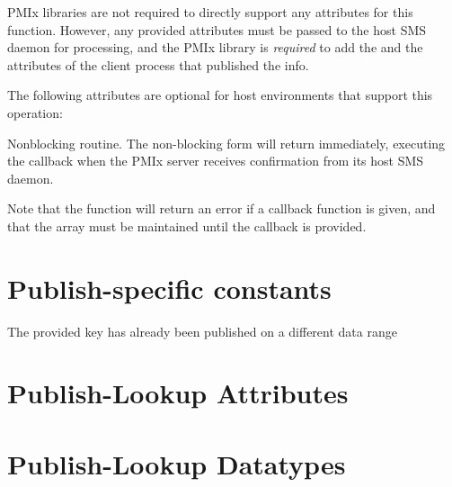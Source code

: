 \reqattrstart
\ac{PMIx} libraries are not required to directly support any attributes for this function. However, any provided attributes must be passed to the host \ac{SMS} daemon for processing, and the \ac{PMIx} library is \textit{required} to add the  and the  attributes of the client process that published the info.

\reqattrend

\optattrstart
The following attributes are optional for host environments that support this operation:


\optattrend

\descr

Nonblocking  routine. The non-blocking form will return immediately, executing the callback when the \ac{PMIx} server receives confirmation from its host \ac{SMS} daemon.

Note that the function will return an error if a  callback function is given, and that the  array must be maintained until the callback is provided.


\section{Publish-specific constants}

\begin{constantdesc}

%
The provided key has already been published on a different data range

\end{constantdesc}


\section{Publish-Lookup Attributes}

%

%

\section{Publish-Lookup Datatypes}

